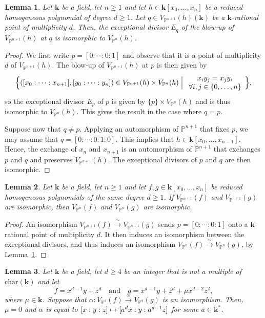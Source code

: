 \documentclass[JEP,XML,SOM,Unicode,NoFloatCountersInSection,published]{cedram}
\newcommand\mto{\mathchoice{\longmapsto}{\mapsto}{\mapsto}{\mapsto}}
\newcommand\quand{\quad\text{and}\quad}
\newtheorem{lemma}{Lemma}[section]
\theoremstyle{definition}
\newcommand\iso{\stackrel{\simeq}{\longrightarrow}}
\renewcommand\k{{\mathbf k}}
\newcommand\p{{\mathbb P}}\let\PP\p
\newcommand{\kk}{\mathbf{k}}
\newcommand{\Bigset}[2]{\Bigl\{#1 \Bigm| #2\Bigr\}}
\begin{document}
\begin{lemma}\label{Lem:ExcDivisorMultmax}
Let $\kk$ be a field, let $n\ge 1$ and let $h\in \kk[x_0,\ldots,x_n]$ be a reduced homogeneous polynomial of degree $d\ge 1$. Let $q\in V_{\p^{n+1}}(h)(\k)$ be a $\k$-rational point of multiplicity $d$. Then, the exceptional divisor $E_q$ of the blow-up of $V_{\p^{n+1}}(h)$ at $q$ is isomorphic to $V_{\p^{n}}(h)$.
\end{lemma}
\begin{proof}
We first write $p=[0:\cdots:0:1]$ and observe that it is a point of multiplicity $d$ of $V_{\p^{n+1}}(h)$. The blow-up of $V_{\p^{n+1}}(h)$ at $p$ is then given by
\[
\Bigset{([x_0:\cdots:x_{n+1}],[y_0:\cdots:y_n])\in V_{\p^{n+1}}(h)\times V_{\p^{n}}(h)}
{\begin{array}{c}
x_iy_j=x_jy_i \\
\forall i,j\in \{0,\ldots,n\}
\end{array}},
\]
so the exceptional divisor $E_p$ of $p$ is given by $\{p\} \times V_{\p^n}(h)$ and is thus isomorphic to $V_{\p^n}(h)$. This gives the result in the case where $q=p$.

Suppose now that $q\neq p$. Applying an automorphism of $\p^{n+1}$ that fixes $p$, we may assume that $q=[0:\cdots:0:1:0]$. This implies that $h\in \k[x_0,\ldots,x_{n-1}]$. Hence, the exchange of $x_n$ and $x_{n+1}$ is an automorphism of $\p^{n+1}$ that exchanges $p$ and $q$ and preserves $V_{\p^{n+1}}(h)$. The exceptional divisors of $p$ and $q$ are then isomorphic.
\end{proof}

\begin{lemma}\label{Lem:IsoHypNNplus}
Let $\kk$ be a field, let $n\ge 1$ and let $f,g\in \kk[x_0,\ldots,x_n]$ be reduced
homogeneous polynomials of the same degree $d\ge 1$. If $V_{\p^{n+1}}(f)$ and $V_{\p^{n+1}}(g)$ are isomorphic, then $V_{\p^{n}}(f)$ and $V_{\p^{n}}(g)$ are isomorphic.
\end{lemma}
\begin{proof}
An isomorphism $V_{\p^{n+1}}(f)\iso V_{\p^{n+1}}(g)$ sends $p=[0:\cdots:0:1]$ onto a $\k$-rational point of multiplicity $d$. It then induces an isomorphism between the exceptional divisors, and thus induces an isomorphism $V_{\p^{n}}(f)\iso V_{\p^{n}}(g)$, by Lemma~\ref{Lem:ExcDivisorMultmax}.
\end{proof}

\begin{lemma}\label{LemmCurveD}
Let $\kk$ be a field, let $d\ge 4$ be an integer that is not a multiple of $\mathrm{char}(\kk)$ and let
\[f=x^{d-1}y+z^{d} \quand g=x^{d-1}y+z^{d}+\mu x^{d-2}z^2,\]
where $\mu\in \k$. Suppose that $\alpha\colon V_{\p^2}(f)\iso V_{\p^2}(g)$ is an isomorphism. Then, $\mu=0$ and $\alpha$ is equal to $[x:y:z]\mto [a^d x:y:a^{d-1} z]$ for some $a\in \k^*$.
\end{lemma}
\end{document}
